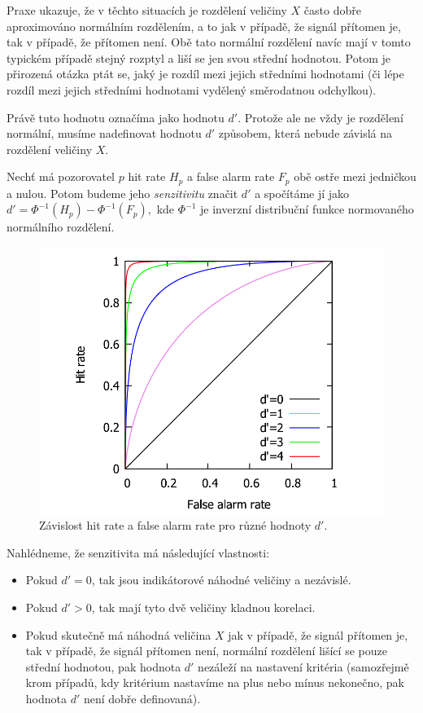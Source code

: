 Praxe ukazuje, že v těchto situacích je rozdělení veličiny $X$ často dobře
aproximováno normálním rozdělením, a to jak v případě, že signál přítomen je,
tak v případě, že přítomen není. Obě tato normální rozdělení navíc mají v tomto
typickém případě stejný rozptyl a liší se jen svou střední hodnotou. Potom je
přirozená otázka ptát se, jaký je rozdíl mezi jejich středními hodnotami (či lépe
rozdíl mezi jejich středními hodnotami vydělený směrodatnou odchylkou).

Právě tuto hodnotu označíma jako hodnotu $d'$. Protože ale ne vždy je rozdělení
normální, musíme nadefinovat hodnotu $d'$ způsobem, která nebude závislá na rozdělení
veličiny $X$.

\begin{definice}\label{dprime}
Nechť má pozorovatel $p$ hit rate $H_p$ a false alarm rate $F_p$ obě ostře mezi jedničkou a nulou. Potom budeme jeho \emph{senzitivitu}
značit $d'$ a spočítáme jí jako $d' = \Phi^{-1}(H_p) - \Phi^{-1}(F_p),$ kde $\Phi^{-1}$ je inverzní distribuční funkce normovaného normálního rozdělení.
\end{definice}

\begin{figure}[h!]
  \includegraphics[width=.8\linewidth]{graphs/ROC.pdf}
  \centering
\caption{Závislost hit rate a false alarm rate pro různé hodnoty $d'$.} 
\label{obr:dprime} 
\end{figure}


Nahlédneme, že senzitivita má následující vlastnosti:
\begin{itemize}
\item Pokud $d' = 0$, tak jsou indikátorové náhodné veličiny  a  nezávislé.
\item Pokud $d' > 0$, tak mají tyto dvě veličiny kladnou korelaci.
\item Pokud skutečně má náhodná veličina $X$ jak v případě, že signál přítomen je, tak v případě, že signál přítomen není, normální rozdělení lišící se pouze střední hodnotou, pak hodnota $d'$ nezáleží na nastavení kritéria (samozřejmě krom případů, kdy kritérium nastavíme na plus nebo mínus nekonečno, pak hodnota $d'$ není dobře definovaná).
\end{itemize}

